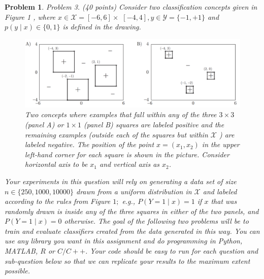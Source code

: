 \documentclass[10pt]{article}
\newtheorem{problem}{Problem}
\begin{document}
\begin{problem}
Problem 3. (40 points) Consider two classification concepts given in Figure 1 , where $x \in \mathcal{X}=[-6,6] \times$ $[-4,4], y \in \mathcal{Y}=\{-1,+1\}$ and $p(y \mid x) \in\{0,1\}$ is defined in the drawing.

\begin{figure}[H]
\includegraphics[width=16cm, keepaspectratio]{Problem3}
\caption{Two concepts where examples that fall within any of the three $3 \times 3$ (panel A) or $1 \times 1$ (panel B) squares are labeled positive and the remaining examples (outside each of the squares but within $\mathcal{X}$ ) are labeled negative. The position of the point $x=\left(x_{1}, x_{2}\right)$ in the upper left-hand corner for each square is shown in the picture. Consider horizontal axis to be $x_{1}$ and vertical axis as $x_{2}$.}
\end{figure}


Your experiments in this question will rely on generating a data set of size $n \in\{250,1000,10000\}$ drawn from a uniform distribution in $\mathcal{X}$ and labeled according to the rules from Figure $1 ;$ e.g., $P(Y=1 \mid x)=1$ if $x$ that was randomly drawn is inside any of the three squares in either of the two panels, and $P(Y=1 \mid x)=0$ otherwise. The goal of the following two problems will be to train and evaluate classifiers created from the data generated in this way. You can use any library you want in this assignment and do programming in Python, MATLAB, $R$ or $C / C++$. Your code should be easy to run for each question and sub-question below so that we can replicate your results to the maximum extent possible.


\end{problem}
\end{document}
